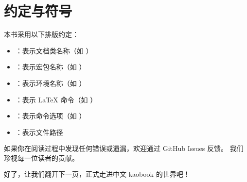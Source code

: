 %
%
%

\section*{约定与符号}

本书采用以下排版约定：
\begin{itemize}
    \item {}：表示文档类名称（如 ）
    \item {}：表示宏包名称（如 ）
    \item {}：表示环境名称（如 ）
    \item {}：表示 \LaTeX{} 命令（如 ）
    \item {}：表示命令选项（如 ）
    \item {}：表示文件路径
\end{itemize}

\begin{kaobox}[title=提示]
如果你在阅读过程中发现任何错误或遗漏，欢迎通过 GitHub Issues 反馈。
我们珍视每一位读者的贡献。
\end{kaobox}

好了，让我们翻开下一页，正式走进中文 kaobook 的世界吧！

\endinput
